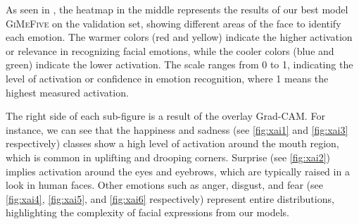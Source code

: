 As seen in , 
the heatmap in the middle represents the results of our best model \textsc{GiMeFive} on the validation set, 
showing different areas of the face to identify each emotion. 
The warmer colors (red and yellow) indicate the higher activation or relevance in recognizing facial emotions, 
while the cooler colors (blue and green) indicate the lower activation. 
The scale ranges from 0 to 1, 
indicating the level of activation or confidence in emotion recognition,
where 1 means the highest measured activation. 

The right side of each sub-figure is a result of the overlay Grad-CAM. 
For instance, 
we can see that the happiness and sadness (see \cref{fig:xai1} and \cref{fig:xai3} respectively) 
classes show a high level of activation around the mouth region, 
which is common in uplifting and drooping corners. 
Surprise (see \cref{fig:xai2}) implies activation around the eyes and eyebrows, which are typically raised in a look in human faces. 
Other emotions such as anger, disgust, and fear (see \cref{fig:xai4}, \cref{fig:xai5}, and \cref{fig:xai6} respectively) 
represent entire distributions, highlighting the complexity of facial expressions from our models.

